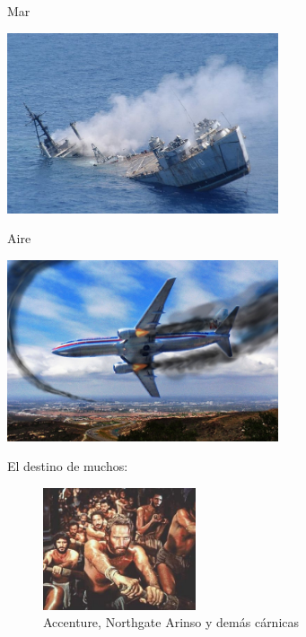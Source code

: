 \documentclass[14pt]{beamer}
\begin{document}
\begin{frame}{Mar}
  \begin{center}
    \includegraphics[width=0.6\textwidth]{pics/ship-sinking.jpg}
  \end{center}
\end{frame}

\begin{frame}{Aire}
  \begin{center}
    \includegraphics[width=0.6\textwidth]{pics/plane-crashing.jpg}
  \end{center}
\end{frame}

\begin{frame}{}
\begin{block}{}
    \centering \Large El destino de muchos: 
\end{block}
\begin{figure}
  \centering
  \includegraphics[width=0.4\textwidth]{pics/ben-hur-rowing.jpg}
  \caption*{Accenture, Northgate Arinso y demás cárnicas}
\end{figure}
\end{frame}
\end{document}
